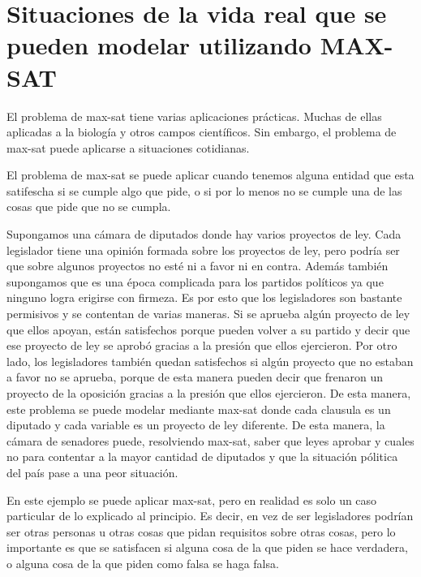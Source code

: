 \documentclass[a4paper,10pt]{article}
\begin{document}
\section*{Situaciones de la vida real que se pueden modelar utilizando MAX-SAT}

El problema de max-sat tiene varias aplicaciones pr\'acticas. Muchas de ellas aplicadas a la biolog\'ia y otros campos cient\'ificos. Sin embargo, el problema de max-sat puede aplicarse a situaciones cotidianas.

El problema de max-sat se puede aplicar cuando tenemos alguna entidad que esta satifescha si se cumple algo que pide, o si por lo menos no se cumple una de las cosas que pide que no se cumpla.

Supongamos una c\'amara de diputados donde hay varios proyectos de ley. Cada legislador tiene una opini\'on formada sobre los proyectos de ley, pero podr\'ia ser que sobre algunos proyectos no est\'e ni a favor ni en contra. Adem\'as tambi\'en supongamos que es una \'epoca complicada para los partidos pol\'iticos ya que ninguno logra erigirse con firmeza. Es por esto que los legisladores son bastante permisivos y se contentan de varias maneras. Si se aprueba alg\'un proyecto de ley que ellos apoyan, est\'an satisfechos porque pueden volver a su partido y decir que ese proyecto de ley se aprob\'o gracias a la presi\'on que ellos ejercieron. Por otro lado, los legisladores tambi\'en quedan satisfechos si alg\'un proyecto que no estaban a favor no se aprueba, porque de esta manera pueden decir que frenaron un proyecto de la oposici\'on gracias a la presi\'on que ellos ejercieron. De esta manera, este problema se puede modelar mediante max-sat donde cada clausula es un diputado y cada variable es un proyecto de ley diferente. De esta manera, la c\'amara de senadores puede, resolviendo max-sat, saber que leyes aprobar y cuales no para contentar a la mayor cantidad de diputados y que la situaci\'on p\'olitica del pa\'is pase a una peor situaci\'on.


En este ejemplo se puede aplicar max-sat, pero en realidad es solo un caso particular de lo explicado al principio. Es decir, en vez de ser legisladores podr\'ian ser otras personas u otras cosas que pidan requisitos sobre otras cosas, pero lo importante es que se satisfacen si alguna cosa de la que piden se hace verdadera, o alguna cosa de la que piden como falsa se haga falsa.


\bigskip
\end{document}
